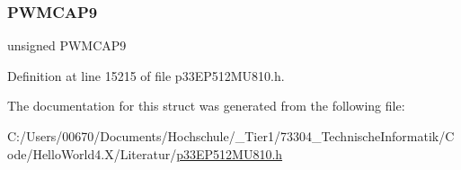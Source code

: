 \mbox{\label{structtag_p_w_m_c_a_p5_b_i_t_s_a9a0cd5d7a58681927adecfd9946b75fb}} 
\subsubsection{\texorpdfstring{P\+W\+M\+C\+A\+P9}{PWMCAP9}}
{\footnotesize\ttfamily unsigned P\+W\+M\+C\+A\+P9}



Definition at line 15215 of file p33\+E\+P512\+M\+U810.\+h.



The documentation for this struct was generated from the following file\+:\begin{DoxyCompactItemize}
\item 
C\+:/\+Users/00670/\+Documents/\+Hochschule/\+\_\+\+Tier1/73304\+\_\+\+Technische\+Informatik/\+Code/\+Hello\+World4.\+X/\+Literatur/\hyperlink{p33_e_p512_m_u810_8h}{p33\+E\+P512\+M\+U810.\+h}\end{DoxyCompactItemize}
